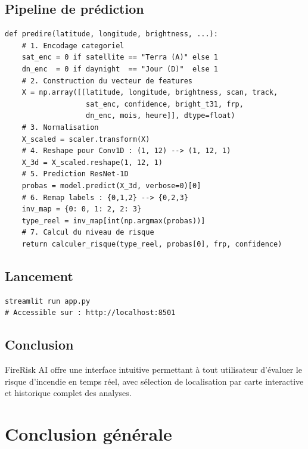 \documentclass[12pt,a4paper]{report}
\begin{document}
\section{Pipeline de pr\'{e}diction}

\begin{lstlisting}[style=python, caption={Pipeline complet de pr\'{e}diction dans l'application}]
def predire(latitude, longitude, brightness, ...):
    # 1. Encodage categoriel
    sat_enc = 0 if satellite == "Terra (A)" else 1
    dn_enc  = 0 if daynight  == "Jour (D)"  else 1
    # 2. Construction du vecteur de features
    X = np.array([[latitude, longitude, brightness, scan, track,
                   sat_enc, confidence, bright_t31, frp,
                   dn_enc, mois, heure]], dtype=float)
    # 3. Normalisation
    X_scaled = scaler.transform(X)
    # 4. Reshape pour Conv1D : (1, 12) --> (1, 12, 1)
    X_3d = X_scaled.reshape(1, 12, 1)
    # 5. Prediction ResNet-1D
    probas = model.predict(X_3d, verbose=0)[0]
    # 6. Remap labels : {0,1,2} --> {0,2,3}
    inv_map = {0: 0, 1: 2, 2: 3}
    type_reel = inv_map[int(np.argmax(probas))]
    # 7. Calcul du niveau de risque
    return calculer_risque(type_reel, probas[0], frp, confidence)
\end{lstlisting}

\section{Lancement}

\begin{lstlisting}[style=python, caption={Commande de lancement}]
streamlit run app.py
# Accessible sur : http://localhost:8501
\end{lstlisting}

\section{Conclusion}

FireRisk AI offre une interface intuitive permettant \`{a} tout utilisateur d'\'{e}valuer le risque d'incendie en temps r\'{e}el, avec s\'{e}lection de localisation par carte interactive et historique complet des analyses.

\chapter*{Conclusion g\'{e}n\'{e}rale}
\end{document}
